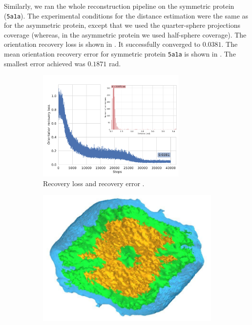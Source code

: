 Similarly, we ran the whole reconstruction pipeline on the symmetric protein (\texttt{5a1a}).
The experimental conditions for the distance estimation were the same as for the asymmetric protein, except that we used the quarter-sphere projections coverage (whereas, in the asymmetric protein we used half-sphere coverage).
The orientation recovery loss is shown in .
It successfully converged to $0.0381$.
The mean orientation recovery error for symmetric protein \texttt{5a1a} is shown in .
The smallest error achieved was $0.1871$ rad.

\begin{figure}[ht!]
    \centering
    \begin{subfigure}[b]{0.45\textwidth}
        \centering
        \includegraphics[height=5.5cm]{figures/5a1a_noise0_ar_aa}
        \caption{Recovery loss  and recovery error .}
    \end{subfigure}
    \hfill
    \begin{subfigure}[b]{0.25\textwidth}
        \centering
        \includegraphics[width=0.99\linewidth]{figures/5a1a_ground_truth}

\end{subfigure}
\end{figure}
